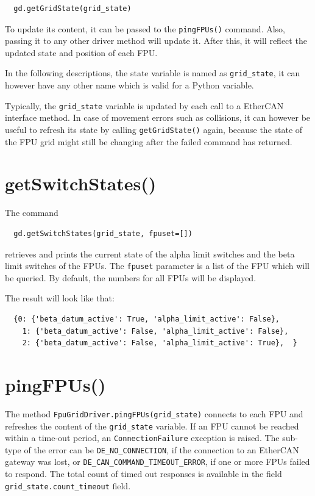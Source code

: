 \documentclass[fontsize=12,a4paper]{scrreprt}
\begin{document}
\begin{verbatim}
  gd.getGridState(grid_state)
\end{verbatim}

To update its content, it can be passed to the \texttt{pingFPUs()}
command. Also, passing it to any other driver method will update
it. After this, it will reflect the updated state and position of each
FPU.

In the following descriptions, the state variable is named as
\texttt{grid\_state}, it can however have any other name which is
valid for a Python variable.

Typically, the \texttt{grid\_state} variable is updated by each call
to a EtherCAN interface method. In case of movement errors such as collisions, it
can however be useful to refresh its state by calling
\texttt{getGridState()} again, because the state of the FPU grid might
still be changing after the failed command has returned.

\section{getSwitchStates()}

The command
\begin{verbatim}
  gd.getSwitchStates(grid_state, fpuset=[])
\end{verbatim}
retrieves and prints the current state of the alpha limit switches
and the beta limit switches of the FPUs.  The \texttt{fpuset}
parameter is a list of the FPU which will be queried. By default, the
numbers for all FPUs will be displayed.

The result will look like that:
\begin{verbatim}
  {0: {'beta_datum_active': True, 'alpha_limit_active': False},
    1: {'beta_datum_active': False, 'alpha_limit_active': False},
    2: {'beta_datum_active': False, 'alpha_limit_active': True},  }
\end{verbatim}




\section{pingFPUs()}
\begin{sloppypar}
  The method
\texttt{FpuGridDriver.pingFPUs(grid\_state)} connects to each FPU and
refreshes the content of the \texttt{grid\_state} variable. If an FPU
cannot be reached within a time-out period, an
\texttt{ConnectionFailure} exception is raised. The sub-type of the
error can be \texttt{DE\_NO\_CONNECTION}, if the connection to an
EtherCAN gateway was lost, or
\texttt{DE\_CAN\_COMMAND\_TIMEOUT\_ERROR}, if one or more FPUs failed
to respond. The total count of timed out responses is available in the
field \texttt{grid\_state.count\_timeout} field.
\end{sloppypar}
\end{document}
